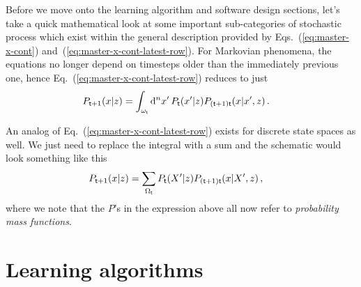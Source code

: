 Before we move onto the learning algorithm and software design sections, let's take a quick mathematical look at some important sub-categories of stochastic process which exist within the general description provided by Eqs.~(\ref{eq:master-x-cont}) and~(\ref{eq:master-x-cont-latest-row}). For Markovian phenomena, the equations no longer depend on timesteps older than the immediately previous one, hence Eq.~(\ref{eq:master-x-cont-latest-row}) reduces to just
\begin{align}
P_{{\sf t}+1}(x\vert z) &= \int_{\omega_{\sf t}}{\rm d}^nx' \, P_{\sf t}(x'\vert z) P_{({\sf t}+1){\sf t}}(x\vert x',z) \label{eq:master-x-cont-markov} \,.
\end{align}

An analog of Eq.~(\ref{eq:master-x-cont-latest-row}) exists for discrete state spaces as well. We just need to replace the integral with a sum and the schematic would look something like this
\begin{align}
P_{{\sf t}+1}(x\vert z) &= \sum_{\Omega_{{\sf t}}} P_{{\sf t}}(X'\vert z) P_{({\sf t}+1){\sf t}}(x \vert X', z) \label{eq:master-x-disc} \,,
\end{align}
where we note that the $P$'s in the expression above all now refer to \emph{probability mass functions}.

\section{\sffamily Learning algorithms}

